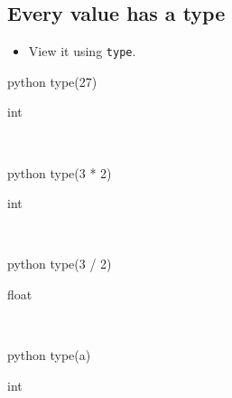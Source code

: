 \documentclass[aspectratio=1610,slidestop]{beamer}
\begin{document}
\subsection{Every value has a type}
\begin{pframe}
 \begin{itemize}
  \item View it using \texttt{type}.
 \end{itemize}

 \begin{ipython}
  \begin{pythonin}{python}
type(27)
  \end{pythonin}
  \begin{pythonout}
int
  \end{pythonout}
  \\

  \begin{pythonin}{python}
type(3 * 2)
  \end{pythonin}
  \begin{pythonout}
int
  \end{pythonout}
  \\

  \begin{pythonin}{python}
type(3 / 2)
  \end{pythonin}
  \begin{pythonout}
float
  \end{pythonout}
  \\

  \begin{pythonin}{python}
type(a)
  \end{pythonin}
  \begin{pythonout}
int
  \end{pythonout}
 \end{ipython}
\end{pframe}
\end{document}
